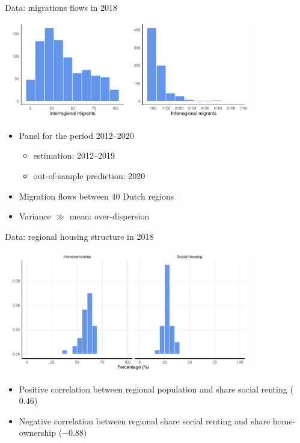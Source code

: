 \documentclass{beamer}
\begin{document}
\begin{frame}{Data: migrations flows in 2018}
	\begin{center}
		\includegraphics[width=0.8\textwidth]{../../fig/hist_mig_corop}      
	\end{center}
\begin{itemize}
  \item Panel for the period 2012--2020
	\begin{itemize}
		\item estimation: 2012--2019
		\item out-of-sample prediction: 2020
	\end{itemize}
	\item Migration flows \alert{between} 40 Dutch regions
	\item Variance $\gg$ mean: \alert{over-dispersion}
\end{itemize}
\end{frame}

\begin{frame}{Data: regional housing structure in 2018}
\begin{center}
	\includegraphics[width=0.8\textwidth]{../../fig/hist_housing_corop}
\end{center}
\begin{itemize}
	\item Positive correlation between regional population and share social renting ($0.46$)
	\item Negative correlation between regional share social renting and share home-ownership ($-0.88)$
\end{itemize}
\end{frame}
\end{document}
